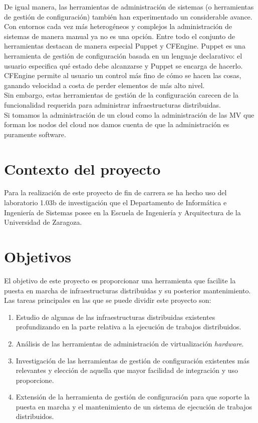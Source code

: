 De igual manera, las herramientas de administración de sistemas (o herramientas de gestión de configuración) también han experimentado un considerable avance. Con entornos cada vez más heterogéneos y complejos la administración de sistemas de manera manual ya no es una opción. Entre todo el conjunto de  herramientas destacan de manera especial Puppet y CFEngine. Puppet es una herramienta de gestión de configuración basada en un lenguaje  declarativo: el usuario especifica qué estado debe alcanzarse y Puppet se encarga de hacerlo. CFEngine permite al usuario un control más fino de cómo se hacen las cosas, ganando velocidad a costa de perder elementos de más alto nivel.\\

Sin embargo, estas herramientas de gestión de la configuración carecen de la funcionalidad requerida para administrar infraestructuras distribuidas.\\

Si tomamos la administración de un cloud como la administración de las MV que forman los nodos del cloud nos damos cuenta de que la administración es puramente software.\\

\section{Contexto del proyecto}

Para la realización de este proyecto de fin de carrera se ha hecho uso del laboratorio 1.03b de investigación que el Departamento de Informática e Ingeniería de Sistemas posee en la Escuela de Ingeniería y Arquitectura de la Universidad de Zaragoza.

\section{Objetivos}

El objetivo de este proyecto es proporcionar una herramienta que facilite la puesta en marcha de infraestructuras distribuidas y su posterior mantenimiento. Las tareas principales en las que se puede dividir este proyecto son:

\begin{enumerate}
\item Estudio de algunas de las infraestructuras distribuidas existentes profundizando en la parte relativa a la ejecución de trabajos distribuidos.
\item Análisis de las herramientas de administración de virtualización \emph{hardware}.
\item Investigación de las herramientas de gestión de configuración existentes más relevantes y elección de aquella que mayor facilidad de integración y uso proporcione.
\item Extensión de la herramienta de gestión de configuración para que soporte la puesta en marcha y el mantenimiento de un sistema de ejecución de trabajos distribuidos.
\end{enumerate}

